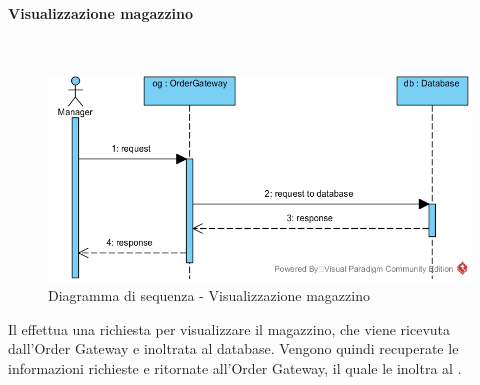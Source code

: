 \begin{samepage}
\paragraph{Visualizzazione magazzino}\mbox{}\\
\end{samepage}
\begin{figure}[H]
	\centering
	\includegraphics[width=15cm]{../../documenti/SpecificaTecnica/diagrammi_img/sequenza/direttore_visualizza_magazzino.png}
	\caption{Diagramma di sequenza - Visualizzazione magazzino}
\end{figure}
Il \Manager{} effettua una richiesta per visualizzare il magazzino, che viene ricevuta dall'Order Gateway e inoltrata al database. Vengono quindi recuperate le informazioni richieste e ritornate all'Order Gateway, il quale le inoltra al \Manager{}.

